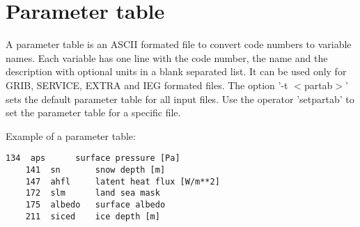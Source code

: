 \section{Parameter table}

A parameter table is an ASCII formated file to convert code numbers to variable names.
Each variable has one line with the code number, the name and the description
with optional units in a blank separated list.
It can be used only for GRIB, SERVICE, EXTRA and IEG formated files.
The \CDO option '-t $<$partab$>$' sets the default parameter table for all input files.
Use the operator 'setpartab' to set the parameter table for a specific file.

\vspace{2mm}

\begin{minipage}[t]{\textwidth}
Example of a \CDO parameter table:
\begin{lstlisting}[frame=single, backgroundcolor=\color{zebg}, basicstyle=\footnotesize]
    134  aps      surface pressure [Pa]
    141  sn       snow depth [m]
    147  ahfl     latent heat flux [W/m**2]
    172  slm      land sea mask
    175  albedo   surface albedo
    211  siced    ice depth [m]
\end{lstlisting}
\end{minipage}

